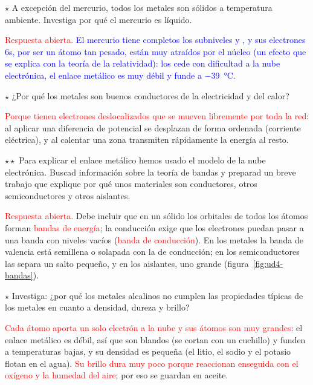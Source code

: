 \begin{exercise}
    \(\star\) A excepción del mercurio, todos los metales son sólidos a temperatura ambiente. Investiga por qué el mercurio es
    líquido.
    \begin{solu}
        \textcolor{red}{Respuesta abierta.} \textcolor{blue}{El mercurio tiene completos los subniveles  y
        , y sus electrones 6s, por ser un átomo tan pesado, están muy atraídos por el núcleo (un efecto que se explica con
        la teoría de la relatividad): los cede con dificultad a la nube electrónica, el enlace metálico es muy débil y funde a
        \qty{-39}{\degreeCelsius}.}
    \end{solu}
\end{exercise}

\begin{exercise}
    \(\star\) ¿Por qué los metales son buenos conductores de la electricidad y del calor?
    \begin{solu}
        \textcolor{red}{Porque tienen electrones deslocalizados que se mueven libremente por toda la red}: al aplicar una diferencia
        de potencial se desplazan de forma ordenada (corriente eléctrica), y al calentar una zona transmiten rápidamente la energía
        al resto.
    \end{solu}
\end{exercise}

\begin{exercise}
    \(\star\star\) Para explicar el enlace metálico hemos usado el modelo de la nube electrónica. Buscad información sobre la
    teoría de bandas y preparad un breve trabajo que explique por qué unos materiales son conductores, otros semiconductores y
    otros aislantes.
    \begin{solu}
        \textcolor{red}{Respuesta abierta.} Debe incluir que en un sólido los orbitales de todos los átomos forman
        \textcolor{red}{bandas de energía}; la conducción exige que los electrones puedan pasar a una banda con niveles vacíos
        (\textcolor{red}{banda de conducción}). En los metales la banda de valencia está semillena o solapada con la de
        conducción; en los semiconductores las separa un salto pequeño, y en los aislantes, uno grande
        (figura~\ref{fig:ud4-bandas}).
    \end{solu}
\end{exercise}

\begin{exercise}
    \(\star\) Investiga: ¿por qué los metales alcalinos no cumplen las propiedades típicas de los metales en cuanto a densidad,
    dureza y brillo?
    \begin{solu}
        \textcolor{red}{Cada átomo aporta un solo electrón a la nube y sus átomos son muy grandes}: el enlace metálico es débil,
        así que son blandos (se cortan con un cuchillo) y funden a temperaturas bajas, y su densidad es pequeña (el litio, el sodio
        y el potasio flotan en el agua). \textcolor{red}{Su brillo dura muy poco porque reaccionan enseguida con el oxígeno y la
        humedad del aire}; por eso se guardan en aceite.
    \end{solu}
\end{exercise}

